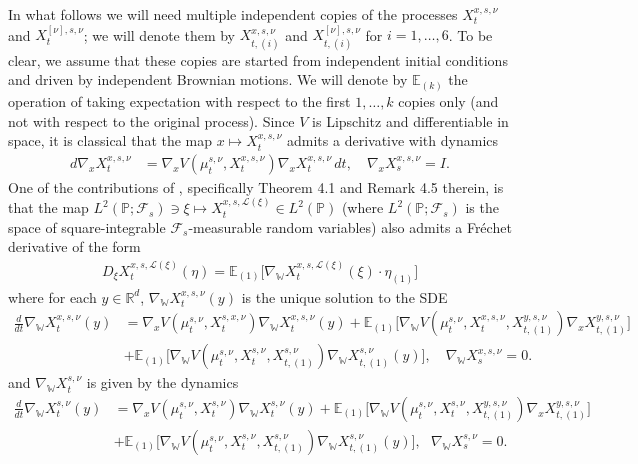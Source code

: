 \documentclass[11pt,reqno]{amsart}
\numberwithin{equation}{section}
\theoremstyle{definition}
\def\E{{\mathbb E}}
\def\R{{\mathbb R}}
\def\P{{\mathbb P}}
\def\Law{\mathcal{L}}
\newcommand{\wgrad}{\nabla_{\W}}
\newcommand{\W}{\mathbb W}
\begin{document}
In what follows we will need multiple independent copies of the processes $X_t^{x,s,\nu}$ and $X_t^{[\nu],s,\nu}$; we will denote them by $X_{t,(i)}^{x,s,\nu}$ and $X_{t,(i)}^{[\nu],s,\nu}$ for $i=1,\dots,6$. To be clear, we assume that these copies are started from independent initial conditions and driven by independent Brownian motions. We will denote by $\E_{(k)}$ the operation of taking expectation with respect to the first $1,\dots,k$ copies only (and not with respect to the original process). Since $ V$ is Lipschitz and differentiable in space, it is classical that the map $x\mapsto X_t^{x,s,\nu}$ admits a derivative with dynamics
\begin{align}
\label{eq: grad of SDE}d\nabla_{x}X^{x,s,\nu}_t&=\nabla_x V(\mu^{s,\nu}_t,X^{x,s,\nu}_t) \nabla_x X_t^{x,s,\nu}\,dt, \quad \nabla_x X_s^{x,s,\nu}=I.
\end{align}
One of the contributions of \cite{Buckdahn2017-op}, specifically Theorem 4.1 and Remark 4.5 therein, is that the map $ L^2(\P;\mathcal F_s)\ni \xi \mapsto X_t^{x,s,\Law(\xi)}\in L^2(\P)$ (where $L^2(\P;\mathcal F_s)$ is the space of square-integrable $\mathcal F_s$-measurable random variables) also admits a Fréchet derivative of the form
\begin{align*}
    D_{\xi}X_t^{x,s,\Law(\xi)}(\eta)=\E_{(1)}\big[\wgrad X_t^{x,s,\Law(\xi)}(\xi)\cdot \eta_{(1)}\big]
\end{align*}
where for each $y\in \R^d$, $\wgrad X_t^{x,s,\nu}(y)$ is the unique solution to the SDE 
\begin{align}
\frac{d}{dt}\wgrad X^{x,s,\nu}_t(y)&=\nabla_x V(\mu_t^{s,\nu},X^{s,x,\nu}_t)\wgrad X_t^{x,s,\nu}(y) +\E_{(1)}\Big[\wgrad  V(\mu_t^{s,\nu},X_t^{x,s,\nu}, X_{t,(1)}^{y,s,\nu})\nabla_x X_{t,(1)}^{y,s,\nu}\Big] \nonumber \\
&+ \E_{(1)}\Big[\wgrad  V(\mu_t^{s,\nu},X_t^{s,\nu}, X_{t,(1)}^{s,\nu})\wgrad X_{t,(1)}^{s,\nu}(y)\Big] , \quad \wgrad X_s^{x,s,\nu}=0. \label{eq: wgrad of SDE point}
\end{align}
and $\wgrad X_t^{s,\nu}$ is given by the dynamics 
\begin{align}
\frac{d}{dt}\wgrad X^{s,\nu}_t(y)&=\nabla_x V(\mu_t^{s,\nu},X^{s,\nu}_t)\wgrad X^{s,\nu}_t(y) +\E_{(1)}\Big[\wgrad  V(\mu_t^{s,\nu},X_t^{s,\nu}, X_{t,(1)}^{y,s,\nu})\nabla_x X_{t,(1)}^{y,s,\nu}\bigg]  \nonumber \\
&+ \E_{(1)}\bigg[\wgrad  V(\mu_t^{s,\nu},X_t^{s,\nu}, X_{t,(1)}^{s,\nu})\wgrad X_{t,(1)}^{s,\nu}(y)\bigg] , \ \ \ \wgrad X_s^{s,\nu}=0. \label{eq: wgrad of SDE}
\end{align}
\end{document}
